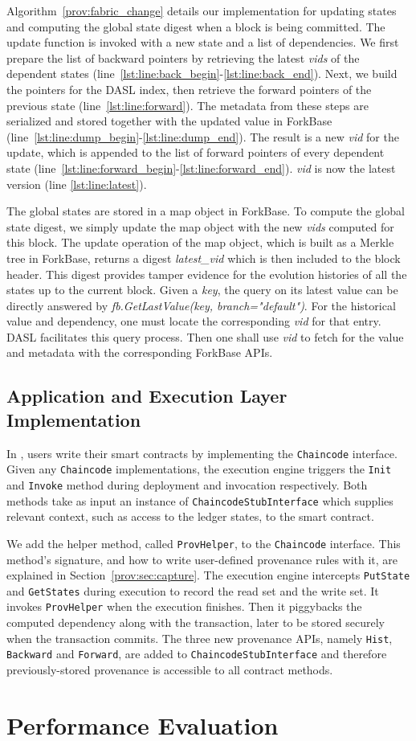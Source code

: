 Algorithm~\ref{prov:fabric_change} details our implementation for updating states
and computing the global state digest when a block is being
committed. The update function is invoked with a new state
and a list of dependencies. We first prepare the list of backward pointers by retrieving the latest {\em vids} of the dependent
states (line~\ref{lst:line:back_begin}-\ref{lst:line:back_end}). Next, we build the pointers for the DASL
index, then retrieve the forward pointers
of the previous state (line~\ref{lst:line:forward}). The metadata from these steps are serialized and stored together with the updated
value in ForkBase (line~\ref{lst:line:dump_begin}-\ref{lst:line:dump_end}). The result is a new {\em vid} for
the update, which is appended to the list of forward pointers of every dependent state
(line~\ref{lst:line:forward_begin}-\ref{lst:line:forward_end}). {\em vid} is now 
the latest version (line \ref{lst:line:latest}). 

The global states are stored in a map object in ForkBase. To compute the global state digest, we simply update
the map object with the new {\em vids} computed for this block. The update operation of the map object, which
is built as a Merkle tree in ForkBase, returns a digest {\em latest\_vid} which is then included
to the block header.  This digest provides tamper evidence for the evolution histories of all the states up to
the current block.
Given a {\em key}, the query on its latest value can be directly answered by \textit{fb.GetLastValue(key, branch="default")}. For the historical value and dependency, one must locate the corresponding {\em vid} for that entry. 
DASL facilitates this query process. 
Then one shall use {\em vid} to fetch for the value and metadata with the corresponding ForkBase APIs. 

\subsection{Application and Execution Layer Implementation}
In {\fs}, users write their smart contracts by implementing the \texttt{Chaincode} interface. Given any  \texttt{Chaincode} implementations, the execution engine triggers the \texttt{Init} and \texttt{Invoke} method during deployment and
invocation respectively. Both methods take as input an instance of \texttt{ChaincodeStubInterface} which
supplies relevant context, such as access to the ledger states, to the smart contract. 

We add the helper method, called \texttt{ProvHelper}, to the \texttt{Chaincode} interface. This method's signature,
and how to write user-defined provenance rules with it, are explained in Section~\ref{prov:sec:capture}. The
execution engine intercepts \texttt{PutState} and \texttt{GetStates} during execution to record the read set and the
write set. It invokes \texttt{ProvHelper} when the execution finishes. Then it piggybacks the computed dependency along with the transaction, later to be stored securely when the transaction commits. 
The three new provenance APIs, namely \texttt{Hist}, \texttt{Backward} and \texttt{Forward}, are added to \texttt{ChaincodeStubInterface}
and therefore previously-stored provenance is accessible to all contract methods. 


\section{Performance Evaluation}
\label{prov:sec:exps}
